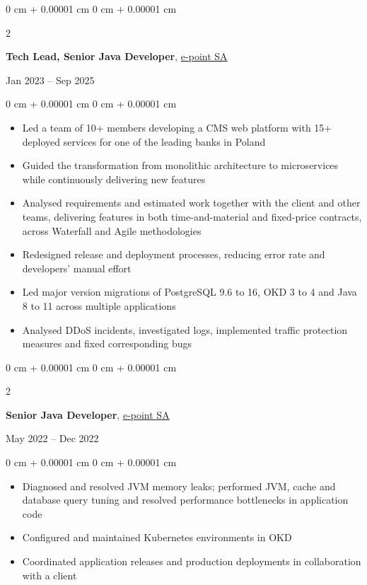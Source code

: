 \documentclass[10pt, letterpaper]{article}
\newenvironment{highlights}{
  \begin{itemize}[
        topsep=0.05 cm,
        parsep=0.05 cm,
        partopsep=0pt,
        itemsep=0pt,
        leftmargin=0 cm + 10pt
      ]
    }{
  \end{itemize}
} %
\newenvironment{onecolentry}{
  \begin{adjustwidth}{
      0 cm + 0.00001 cm
    }{
      0 cm + 0.00001 cm
    }
  }{
  \end{adjustwidth}
} %
\newenvironment{twocolentry}[2][]{
  \onecolentry
  \def\secondColumn{#2}
  \setcolumnwidth{\fill, 4.5 cm}
  \begin{paracol}{2}
  }{
    \switchcolumn \raggedleft \secondColumn
  \end{paracol}
  \endonecolentry
} %
\let\hrefOriginal\href
\renewcommand{\href}[2]{\hrefOriginal{#1}{\uline{#2}}}
\begin{document}
\begin{twocolentry}
  { Jan 2023 – Sep 2025 }
  \textbf{Tech Lead, Senior Java Developer},
  \href{https://www.e-point.com/}{e-point SA}
\end{twocolentry}
\vspace{0.1 cm}
\begin{onecolentry}
  \begin{highlights}
  \item Led a team of 10+ members developing a CMS web platform with
    15+ deployed services for one of the leading banks in Poland
  \item Guided the transformation from monolithic architecture to
    microservices while continuously delivering new features
  \item Analysed requirements and estimated work together with the client
    and other teams, delivering features in both time-and-material and
    fixed-price contracts, across Waterfall and Agile methodologies
  \item Redesigned release and deployment processes, reducing error
    rate and developers' manual effort
  \item Led major version migrations of PostgreSQL 9.6 to 16,
    OKD 3 to 4 and Java 8 to 11 across multiple applications
  \item Analysed DDoS incidents, investigated logs, implemented
    traffic protection measures and fixed corresponding bugs
  \end{highlights}
\end{onecolentry}

\vspace{0.1 cm}

\begin{twocolentry}
  { May 2022 – Dec 2022 }
  \textbf{Senior Java Developer}, \href{https://www.e-point.com/}{e-point SA}
\end{twocolentry}
\vspace{0.1 cm}
\begin{onecolentry}
  \begin{highlights}
  \item Diagnosed and resolved JVM memory leaks; performed JVM,
    cache and database query tuning and resolved performance
    bottlenecks in application code
  \item Configured and maintained Kubernetes environments in OKD
  \item Coordinated application releases and production deployments
    in collaboration with a client
  \end{highlights}
\end{onecolentry}
\end{document}
